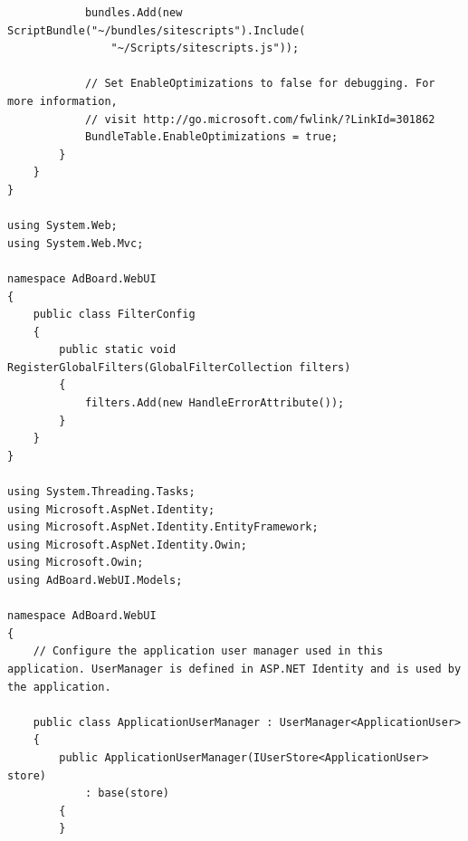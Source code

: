 \documentclass[14pt,a4paper]{extreport}
\begin{document}
\begin{lstlisting}
            bundles.Add(new ScriptBundle("~/bundles/sitescripts").Include(
                "~/Scripts/sitescripts.js"));

            // Set EnableOptimizations to false for debugging. For more information,
            // visit http://go.microsoft.com/fwlink/?LinkId=301862
            BundleTable.EnableOptimizations = true;
        }
    }
}

using System.Web;
using System.Web.Mvc;

namespace AdBoard.WebUI
{
    public class FilterConfig
    {
        public static void RegisterGlobalFilters(GlobalFilterCollection filters)
        {
            filters.Add(new HandleErrorAttribute());
        }
    }
}

using System.Threading.Tasks;
using Microsoft.AspNet.Identity;
using Microsoft.AspNet.Identity.EntityFramework;
using Microsoft.AspNet.Identity.Owin;
using Microsoft.Owin;
using AdBoard.WebUI.Models;

namespace AdBoard.WebUI
{
    // Configure the application user manager used in this application. UserManager is defined in ASP.NET Identity and is used by the application.

    public class ApplicationUserManager : UserManager<ApplicationUser>
    {
        public ApplicationUserManager(IUserStore<ApplicationUser> store)
            : base(store)
        {
        }


\end{lstlisting}
\end{document}
